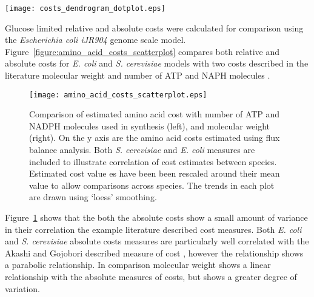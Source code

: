 \begin{sidewaysfigure}
\centering
\texttt{[image: costs\_dendrogram\_dotplot.eps]}
\caption[Comparison of amino acid cost estimates]{Amino acid cost estimates are shown as bar charts on the left hand side. Each bar chart axis shows the minimum and maximum value of each cost type, rounded to three significant figures. The correlations between costs are compared in a dendrogram on the right hand side computed by complete agglomerative clustering using Spearman's Rank correlation distance between data sets. The illustrated data is shown in Appendix Table~\vref{appendix:table:literature_costs}}
\label{figure:costs_dendrogram_dotplot}
\end{sidewaysfigure}

Glucose limited relative and absolute costs were calculated for comparison using the \emph{Escherichia coli iJR904} genome scale model. Figure~\vref{figure:amino_acid_costs_scatterplot} compares both relative and absolute costs for \emph{E. coli} and \emph{S. cerevisiae} models with two costs described in the literature molecular weight \cite{seligmann2004} and number of ATP and NAPH molecules \cite{akashi2002}.

\begin{figure}
\centering
\texttt{[image: amino\_acid\_costs\_scatterplot.eps]}
\caption[Comparison of the genome scale model derived cost data sets.]{Comparison of estimated amino acid cost with number of ATP and NADPH molecules used in synthesis (left), and molecular weight (right). On the y axis are the amino acid costs estimated using flux balance analysis. Both \emph{S. cerevisiae} and \emph{E. coli} measures are included to illustrate correlation of cost estimates between species. Estimated cost value
es have been been rescaled around their mean value to allow comparisons across species. The trends in each plot are drawn using `loess' smoothing.}
\label{figure:amino_acid_costs_scatterplot}
\end{figure}

Figure~\ref{figure:amino_acid_costs_scatterplot} shows that the both the absolute costs show a small amount of variance in their correlation the example literature described cost measures. Both \emph{E. coli} and \emph{S. cerevisiae} absolute costs measures are particularly well correlated with the Akashi and Gojobori described measure of cost \cite{akashi2002}, however the relationship shows a parabolic relationship. In comparison molecular weight shows a linear relationship with the absolute measures of costs, but shows a greater degree of variation.


